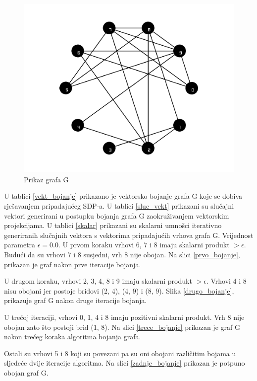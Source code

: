 \documentclass[diplomskirad]{fer}
\begin{document}
\begin{figure}
  \centering
  \includegraphics[scale=0.4]{images/colors_it2.png}
  \caption{Prikaz grafa G}
  \label{grafG}
\end{figure}

U tablici \ref{vekt_bojanje} prikazano je vektorsko bojanje grafa G koje se dobiva rješavanjem pripadajućeg SDP-a.
U tablici \ref{sluc_vekt} prikazani su slučajni vektori generirani u postupku bojanja grafa G zaokruživanjem vektorskim projekcijama.
U tablici \ref{skalar} prikazani su skalarni umnošci iterativno generiranih slučajnih vektora s vektorima pripadajućih vrhova grafa G.
Vrijednost parametra $\epsilon = 0.0$. U prvom koraku vrhovi 6, 7 i 8 imaju skalarni produkt $>\epsilon$. Budući da su vrhovi 7 i 8 susjedni, 
vrh 8 nije obojan. Na slici \ref{prvo_bojanje}, prikazan je graf nakon prve iteracije bojanja.

U drugom koraku, vrhovi 2, 3, 4, 8 i 9 imaju skalarni produkt $>\epsilon$. Vrhovi 4 i 8 nisu obojani jer postoje bridovi (2, 4), (4, 9) i (8, 9).
Slika \ref{drugo_bojanje}, prikazuje graf G nakon druge iteracije bojanja.

U trećoj iteraciji, vrhovi 0, 1, 4 i 8 imaju pozitivni skalarni produkt. Vrh 8 nije obojan zato što postoji brid (1, 8). Na slici \ref{trece_bojanje}
prikazan je graf G nakon trećeg koraka algoritma bojanja grafa.

Ostali su vrhovi 5 i 8 koji su povezani pa su oni obojani različitim bojama u sljedeće dvije iteracije algoritma. Na slici \ref{zadnje_bojanje}
prikazan je potpuno obojan graf G.
\end{document}
